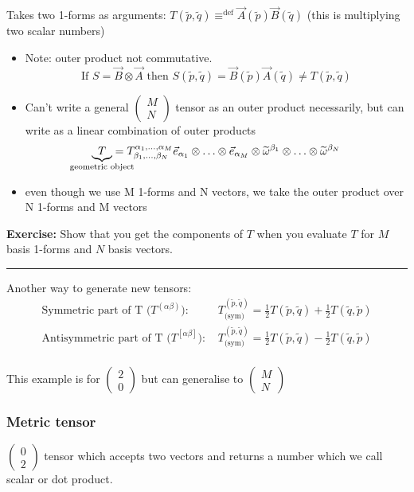 \documentclass[a4paper]{article} %
\newcommand{\exercise}[2]
{
\begin{framed}
\textbf{Exercise:} #1 \\\hrule
#2
\end{framed}
}
\newcommand{\pmx}[1]{
\begin{pmatrix}
#1
\end{pmatrix}
}
\renewcommand{\tilde}{\widetilde}
\begin{document}
Takes two 1-forms as arguments: $T(\tilde{p},\tilde{q}) \equiv^{\text{def}}\vec{A}(\tilde{p})\vec{B}(\tilde{q})$ (this is multiplying two scalar numbers)

\begin{itemize}
\item Note: outer product not commutative.
\begin{equation}
\text{If } S=\vec{B}\otimes \vec{A} \text{ then } S(\tilde{p},\tilde{q})=\vec{B}(\tilde{p})\vec{A}(\tilde{q})\neq T(\tilde{p},\tilde{q})
\end{equation}
\item Can't write a general $\pmx{M\\N}$ tensor as an outer product necessarily, but can write as a linear combination of outer products
\begin{equation}
\underbrace{T}_{\mathclap{\text{geometric object}}}=T^{\alpha_{1},\ldots,\alpha_{M}}_{\beta_{1},\ldots,\beta_{N}}\vec{e}_{\alpha_{1}}\otimes\ldots\otimes \vec{e}_{\alpha_{M}}\otimes \tilde{\omega}^{\beta_{1}}\otimes\ldots\otimes\tilde{\omega}^{\beta_{N}}
\end{equation}
\item even though we use M 1-forms and N vectors, we take the outer product over N 1-forms and M vectors
\end{itemize}

\exercise{Show that you get the components of $T$ when you evaluate $T$ for $M$ basis 1-forms and $N$ basis vectors.}{}

Another way to generate new tensors:
\begin{align*}
\text{Symmetric part of T ($T^{(\alpha\beta)}$): }& T_{\text{(sym)}}^{(\tilde{p},\tilde{q})}=\frac{1}{2}T(\tilde{p},\tilde{q})+\frac{1}{2}T(\tilde{q},\tilde{p})\\
\text{Antisymmetric part of T ($T^{[\alpha\beta]}$): }& T_{\text{(sym)}}^{(\tilde{p},\tilde{q})}=\frac{1}{2}T(\tilde{p},\tilde{q})-\frac{1}{2}T(\tilde{q},\tilde{p})\\
\end{align*}

This example is for $\pmx{2\\0}$ but can generalise to $\pmx{M\\N}$

\subsubsection{Metric tensor}
$\pmx{0\\2}$ tensor which accepts two vectors and returns a number which we call scalar or dot product.
\end{document}
